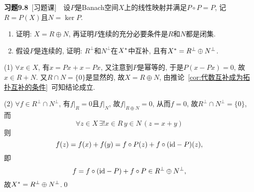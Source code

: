 	\textbf{习题9.8}\ [习题课]\ \ 设$ P $是Banach空间$ X $上的线性映射并满足$ P\circ P=P $, 记$ R=P(X) $且$ N=\ker P $.
	\begin{enumerate}[(1)]
	\item 证明: $ X=R\oplus N $, 再证明$ P $连续的充分必要条件是$ R $和$ N $都是闭集.
	\item 假设$ P $是连续的, 证明: $ R^\bot $和$ N^\bot $在$ X^{*} $中互补, 且有$ X^{*}=R^\bot\oplus N^\bot $.
	\end{enumerate}
	\begin{Proof}
	(1) $ \forall x\in X $, 有$ x=Px+x-Px $, 又注意到$ P $是幂等的, 于是$ P(x-Px)=0 $, 故$ x\in R+N $. 又$ R\cap N=\{0\} $是显然的, 故$ X=R\oplus N $, 由推论~\ref{cor:代数互补成为拓扑互补的条件}~可知结论成立.
	
	(2) $ \forall f\in R^\bot\cap N^\bot $, 有$ f|_R=0 $且$ f|_N $, 故$ f|_{R\oplus N}=0 $, 从而$ f=0 $, 故$ R^\bot\cap N^\bot =\{0\} $, 而
	\[
	\forall z\in X\,\exists!x\in R\,y\in N\,(z=x+y)
	\]
	则
	\[
	f(z)=f(x)+f(y)=f\circ P(z)+f\circ(\mathrm{id}-P)(z),
	\]
	即
	\[
	f=f\circ(\mathrm{id}-P)+f\circ P\in R^\bot\oplus N^\bot,
	\]
	故$ X^{*}=R^\bot\oplus N^\bot $.\qed
	\end{Proof}

